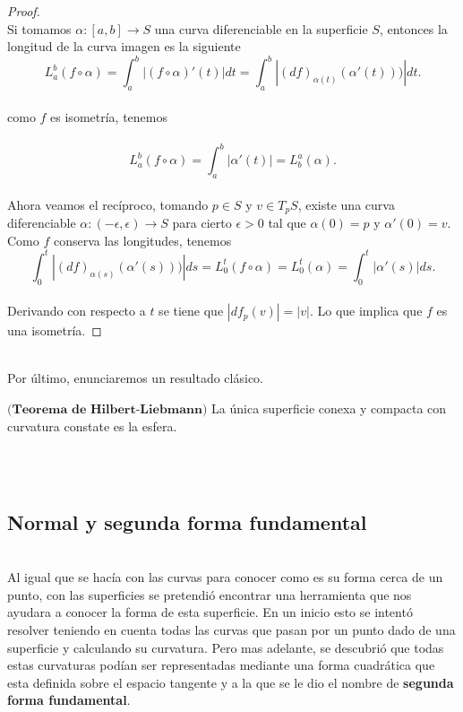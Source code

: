 \begin{proof}
	${}$\\
	
	Si tomamos $\alpha : [a,b] \to S$ una curva diferenciable en la superficie $S$, entonces la longitud de la curva imagen es la siguiente
	${}$\\
	\[
	L^{b}_{a} (f \circ \alpha) = \int^{b}_{a} |(f \circ \alpha)'(t)| dt = \int^{b}_{a} |(df)_{\alpha(t)}(\alpha'(t)))| dt.
	\]
	${}$\\
	como $f$ es isometría, tenemos\\
	${}$\\
	\[
	L^{b}_{a} (f \circ \alpha) = \int^{b}_{a} |\alpha'(t)| = L^{a}_{b} (\alpha).
	\]
	${}$\\
	
	Ahora veamos el recíproco, tomando $p \in S$ y $v \in T_p S$, existe una curva diferenciable $\alpha : (-\epsilon, \epsilon) \to S$ para cierto $\epsilon > 0$ tal que $\alpha(0) = p$ y $\alpha'(0) = v$. Como $f$ conserva las longitudes, tenemos
	${}$\\
	\[
	\int^{t}_{0}|(df)_{\alpha(s)}(\alpha'(s)))| ds = L^{t}_{0} (f \circ \alpha) = L^{t}_{0}(\alpha) = \int^{t}_{0} |\alpha'(s)|ds.
	\]
	${}$\\
	Derivando con respecto a $t$ se tiene que $|df_p(v)|=|v|$. Lo que implica que $f$ es una isometría.
	
\end{proof}
${ }$\\

Por último, enunciaremos un resultado clásico.
${ }$\\

\begin{teorema} \label{teo:hil-lie}
	$\textbf{(Teorema de Hilbert-Liebmann)}$ La única superficie conexa y compacta con curvatura constate es la esfera.
\end{teorema}
${ }$\\



${ }$\\
\subsection{Normal y segunda forma fundamental}
${ }$\\

Al igual que se hacía con las curvas para conocer como es su forma cerca de un punto, con las superficies se pretendió encontrar una herramienta que nos ayudara a conocer la forma de esta superficie. En un inicio esto se intentó resolver teniendo en cuenta todas las curvas que pasan por un punto dado de una superficie y calculando su curvatura. Pero mas adelante, se descubrió que todas estas curvaturas podían ser representadas mediante una forma cuadrática que esta definida sobre el espacio tangente y a la que se le dio el nombre de \textbf{segunda forma fundamental}.
${ }$\\

